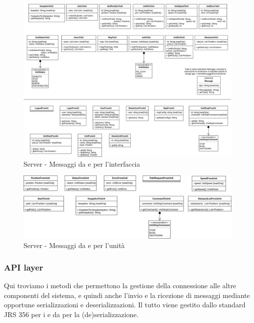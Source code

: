 		\begin{landscape}
			\begin{figure}[]
				\centering
				\includegraphics[width=23cm]{img/server_from_to_ui.png}
				\caption{Server - Messaggi da e per l'interfaccia}
			\end{figure}
		\end{landscape}
		\begin{landscape}

			\begin{figure}[H]
				\centering
				\includegraphics[width=22cm]{img/server_from_to_unit.png}
				\caption{Server - Messaggi da e per l'unità}
			\end{figure}
		\end{landscape}

	\subsubsection{API layer}
		Qui troviamo i metodi che permettono la gestione della connessione alle altre componenti del sistema, e quindi anche l'invio e la ricezione di messaggi mediante opportune serializzazioni e deserializzazioni. Il tutto viene gestito dallo standard JRS 356 per i  e da  per la (de)serializzazione.

